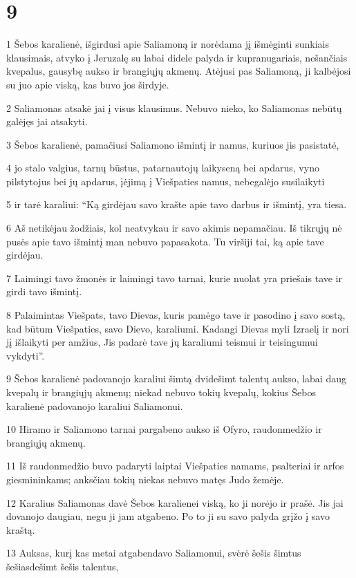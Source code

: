 \chapter{9}

\par 1 Šebos karalienė, išgirdusi apie Saliamoną ir norėdama jį išmėginti sunkiais klausimais, atvyko į Jeruzalę su labai didele palyda ir kupranugariais, nešančiais kvepalus, gausybę aukso ir brangiųjų akmenų. Atėjusi pas Saliamoną, ji kalbėjosi su juo apie viską, kas buvo jos širdyje. 
\par 2 Saliamonas atsakė jai į visus klausimus. Nebuvo nieko, ko Saliamonas nebūtų galėjęs jai atsakyti. 
\par 3 Šebos karalienė, pamačiusi Saliamono išmintį ir namus, kuriuos jis pasistatė, 
\par 4 jo stalo valgius, tarnų būstus, patarnautojų laikyseną bei apdarus, vyno pilstytojus bei jų apdarus, įėjimą į Viešpaties namus, nebegalėjo susilaikyti 
\par 5 ir tarė karaliui: “Ką girdėjau savo krašte apie tavo darbus ir išmintį, yra tiesa. 
\par 6 Aš netikėjau žodžiais, kol neatvykau ir savo akimis nepamačiau. Iš tikrųjų nė pusės apie tavo išmintį man nebuvo papasakota. Tu viršiji tai, ką apie tave girdėjau. 
\par 7 Laimingi tavo žmonės ir laimingi tavo tarnai, kurie nuolat yra priešais tave ir girdi tavo išmintį. 
\par 8 Palaimintas Viešpats, tavo Dievas, kuris pamėgo tave ir pasodino į savo sostą, kad būtum Viešpaties, savo Dievo, karaliumi. Kadangi Dievas myli Izraelį ir nori jį išlaikyti per amžius, Jis padarė tave jų karaliumi teismui ir teisingumui vykdyti”. 
\par 9 Šebos karalienė padovanojo karaliui šimtą dvidešimt talentų aukso, labai daug kvepalų ir brangiųjų akmenų; niekad nebuvo tokių kvepalų, kokius Šebos karalienė padovanojo karaliui Saliamonui. 
\par 10 Hiramo ir Saliamono tarnai pargabeno aukso iš Ofyro, raudonmedžio ir brangiųjų akmenų. 
\par 11 Iš raudonmedžio buvo padaryti laiptai Viešpaties namams, psalteriai ir arfos giesmininkams; anksčiau tokių niekas nebuvo matęs Judo žemėje. 
\par 12 Karalius Saliamonas davė Šebos karalienei viską, ko ji norėjo ir prašė. Jis jai dovanojo daugiau, negu ji jam atgabeno. Po to ji su savo palyda grįžo į savo kraštą. 
\par 13 Auksas, kurį kas metai atgabendavo Saliamonui, svėrė šešis šimtus šešiasdešimt šešis talentus, 
